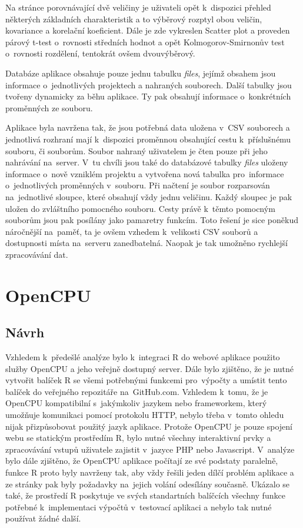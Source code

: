 \documentclass[thesis=B,czech]{FITthesis}[2012/06/26]
\begin{document}
Na stránce porovnávající dvě veličiny je uživateli opět k~dispozici přehled některých základních charakteristik a to výběrový rozptyl obou veličin, kovariance a korelační koeficient. Dále je zde vykreslen Scatter plot a proveden párový t-test o~rovnosti středních hodnot a opět Kolmogorov-Smirnonův test o~rovnosti rozdělení, tentokrát ovšem dvouvýběrový. 

Databáze aplikace obsahuje pouze jednu tabulku \textit{files}, jejímž obsahem jsou informace o~jednotlivých projektech a nahraných souborech. Další tabulky jsou tvořeny dynamicky za běhu aplikace. Ty pak obsahují informace o~konkrétních proměnných ze souboru.

Aplikace byla navržena tak, že jsou potřebná data uložena v~CSV souborech a jednotlivá rozhraní mají k~dispozici proměnnou obsahující cestu k~příslušnému souboru, či souborům. Soubor nahraný uživatelem je čten pouze při jeho nahrávání na~server. V~tu chvíli jsou také do databázové tabulky \textit{files} uloženy informace o~nově vzniklém projektu a vytvořena nová tabulka pro~informace o~jednotlivých proměnných v~souboru. Při načtení je soubor rozparsován na~jednotlivé sloupce, které obsahují vždy jednu veličinu. Každý sloupec je pak uložen do zvláštního pomocného souboru. Cesty právě k~těmto pomocným souborům jsou pak posílány jako pamaretry funkcím. Toto řešení je sice poněkud náročnější na~paměť, ta je ovšem vzhedem k~velikosti CSV souborů a dostupnosti místa na~serveru zanedbatelná. Naopak je tak umožněno rychlejší zpracovávání dat.

\section{OpenCPU}
\subsection{Návrh}
Vzhledem k~předešlé analýze bylo k~integraci R do webové aplikace použito služby OpenCPU a jeho veřejně dostupný server. Dále bylo zjištěno, že je nutné vytvořit balíček R se všemi potřebnými funkcemi pro~výpočty a umístit tento balíček do veřejného repozitáře na~GitHub.com. Vzhledem k~tomu, že je OpenCPU kompatibilní s~jakýmkoliv jazykem nebo frameworkem, který umožňuje komunikaci pomocí protokolu HTTP, nebylo třeba v~tomto ohledu nijak přizpůsobovat použitý jazyk aplikace. Protože OpenCPU je pouze spojení webu se statickým prostředím R, bylo nutné všechny interaktivní prvky a zpracovávání vstupů uživatele zajistit v~jazyce PHP nebo Javascript. V~analýze bylo dále zjištěno, že OpenCPU aplikace počítají ze své podstaty paralelně, funkce R proto byly navrženy tak, aby vždy řešili jeden dílčí problém aplikace a ze stránky pak byly požadavky na~jejich volání odesílány současně. Ukázalo se také, že prostředí R poskytuje ve svých standartních balíčcích všechny funkce potřebné k~implementaci výpočtů v~testovací aplikaci a nebylo tak nutné používat žádné další.    
\end{document}
